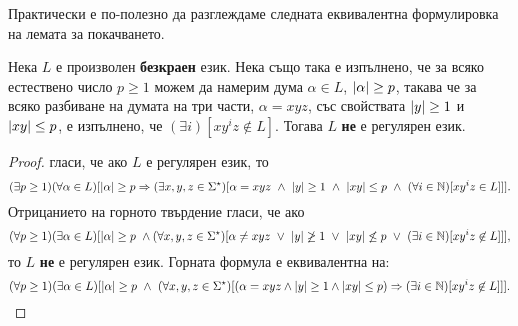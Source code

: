 Практически е по-полезно да разглеждаме следната еквивалентна формулировка на лемата за покачването.
\begin{cor}
  \label{cor:pumping-reg}
  Нека $L$ е произволен {\bf безкраен} език. Нека също така е изпълнено, че за всяко естествено число $p \geq 1$ можем да намерим дума $\alpha \in L$, $\lvert{\alpha}\rvert\geq p$, такава че за всяко разбиване на думата на три части, $\alpha = xyz$,
  със свойствата $\lvert{y}\rvert \geq 1$ и $\lvert{xy}\rvert \leq p$, е изпълнено, че $(\exists i)[xy^iz \not\in L]$.
  Тогава $L$ {\bf не} е регулярен език.
\end{cor}
\begin{proof}
   гласи, че ако $L$ е регулярен език, то
  {\scriptsize
    \[(\exists p \geq 1)(\forall \alpha \in L)[\abs{\alpha} \geq p \Rightarrow (\exists x,y,z\in\Sigma^\star)[\alpha = xyz\ \wedge\ \abs{y} \geq 1\ \wedge\ \abs{xy} \leq p\ \wedge\ (\forall i\in\Nat)[xy^iz \in L]]].\]}
  Отрицанието на горното твърдение гласи, че ако 
  {\scriptsize  \[(\forall p \geq 1)(\exists \alpha \in L)[\abs{\alpha} \geq p\ \wedge (\forall x,y,z\in\Sigma^\star)[\alpha \neq xyz\ \vee\ \abs{y} \not\geq 1\ \vee\ \abs{xy} \not\leq p\ \vee\ (\exists i\in\Nat)[xy^iz \not\in L]]],\]}
  то $L$ {\bf не} е регулярен език.
  Горната формула е еквивалентна на:
  {\scriptsize
    \[(\forall p \geq 1)(\exists \alpha \in L)[\lvert{\alpha}\rvert \geq p\ \wedge\ (\forall x,y,z\in\Sigma^\star)[(\alpha = xyz \wedge \lvert{y}\rvert \geq 1\wedge \lvert{xy}\rvert \leq p) \Rightarrow (\exists i\in\mathbb{N})[xy^iz \not\in L]]].\]}
\end{proof}


